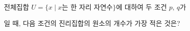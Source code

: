 전체집합 $U=\{x \mid x$는 한 자리 자연수$\}$에 대하여 두 조건 $p$, $q$가\par\smallskip{}\par\smallskip\noindent 일 때, 다음 조건의 진리집합의 원소의 개수가 가장 적은 것은?
